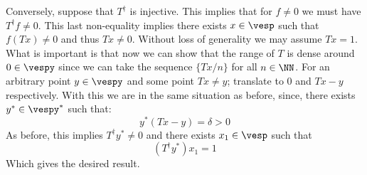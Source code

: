 Conversely, suppose that $T^\dagger $ is injective. This implies that for $f\neq 0$ we must have $T^\dagger f\neq 0$. This last non-equality implies there exists $x\in\vesp$ such that $f(Tx)\neq 0$ and thus $Tx\neq 0$. Without loss of generality we may assume $Tx=1$. What is important is that now we can show that the range of $T$ is dense around $0\in \vespy$ since we can take the sequence $\{Tx/n\}$ for all $n\in \NN$. For an arbitrary point  $y \in \vespy$ and some point $Tx\neq y$; translate to $0$ and $Tx-y$ respectively. With this we are in the same situation as before, since, there exists $y^*\in \vespy^*$ such that:
$$y^*(Tx-y) = \delta>0$$
As before, this implies $T^\dagger y^*\neq 0$ and there exists $x_1\in \vesp$ such that 
$$(T^\dagger y^*)x_1 =1$$
Which gives the desired result.
